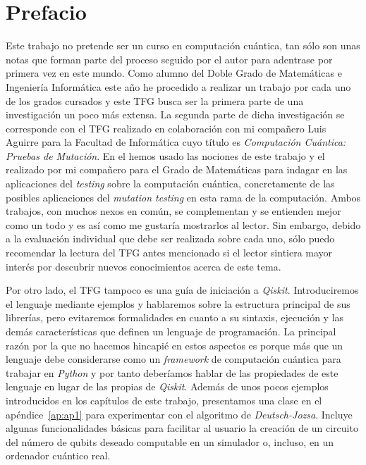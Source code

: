 \chapter*{Prefacio}

Este trabajo no pretende ser un curso en computación cuántica, tan sólo son unas notas que forman parte del proceso seguido por el autor para adentrase por primera vez en este mundo. Como alumno del Doble Grado de Matemáticas e Ingeniería Informática este año he procedido a realizar un trabajo por cada uno de los grados cursados y este TFG busca ser la primera parte de una investigación un poco más extensa. La segunda parte de dicha investigación se corresponde con el TFG realizado en colaboración con mi compañero Luis Aguirre para la Facultad de Informática cuyo título es \textit{Computación Cuántica: Pruebas de Mutación}. En el hemos usado las nociones de este trabajo y el realizado por mi compañero para el Grado de Matemáticas para indagar en las aplicaciones del \textit{testing} sobre la computación cuántica, concretamente de las posibles aplicaciones del \textit{mutation testing} en esta rama de la computación. Ambos trabajos, con muchos nexos en común, se complementan y se entienden mejor como un todo y es así como me gustaría mostrarlos al lector. Sin embargo, debido a la evaluación individual que debe ser realizada sobre cada uno, sólo puedo recomendar la lectura del TFG antes mencionado si el lector sintiera mayor interés por descubrir nuevos conocimientos acerca de este tema.

Por otro lado, el TFG tampoco es una guía de iniciación a \textit{Qiskit}. Introduciremos el lenguaje mediante ejemplos y hablaremos sobre la estructura principal de sus librerías, pero evitaremos formalidades en cuanto a su sintaxis, ejecución y las demás características que definen un lenguaje de programación. La principal razón por la que no hacemos hincapié en estos aspectos es porque más que un lenguaje debe considerarse como un \textit{framework} de computación cuántica para trabajar en \textit{Python} y por tanto deberíamos hablar de las propiedades de este lenguaje en lugar de las propias de \textit{Qiskit}. Además de unos pocos ejemplos introducidos en los capítulos de este trabajo, presentamos una clase en el apéndice~\ref{ap:ap1} para experimentar con el algoritmo de \textit{Deutsch-Jozsa}. Incluye algunas funcionalidades básicas para facilitar al usuario la creación de un circuito del número de qubits deseado computable en un simulador o, incluso, en un ordenador cuántico real.


